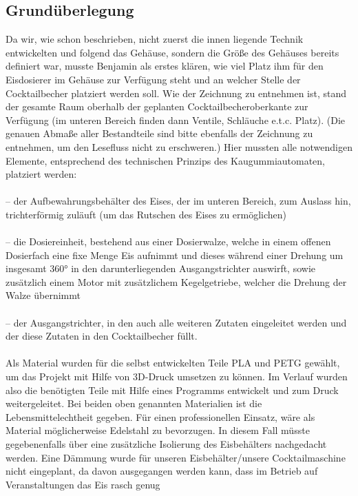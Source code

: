 \documentclass[10pt,a4paper]{report}
\begin{document}
	\subsection{Grundüberlegung}
	Da wir, wie schon beschrieben, nicht zuerst die innen liegende Technik entwickelten und folgend
	das Gehäuse, sondern die Größe des Gehäuses bereits definiert war, musste Benjamin als
	erstes klären, wie viel Platz ihm für den Eisdosierer im Gehäuse zur Verfügung steht und an
	welcher Stelle der Cocktailbecher platziert werden soll. Wie der Zeichnung zu entnehmen ist,
	stand der gesamte Raum oberhalb der geplanten Cocktailbecheroberkante zur Verfügung (im
	unteren Bereich finden dann Ventile, Schläuche e.t.c. Platz). (Die genauen Abmaße aller
	Bestandteile sind bitte ebenfalls der Zeichnung zu entnehmen, um den Lesefluss nicht zu
	erschweren.)
	Hier mussten alle notwendigen Elemente, entsprechend des technischen Prinzips des
	Kaugummiautomaten, platziert werden:\\ \\
	– der Aufbewahrungsbehälter des Eises, der im unteren Bereich, zum Auslass hin,
	trichterförmig zuläuft (um das Rutschen des Eises zu ermöglichen)\\ \\
	– die Dosiereinheit, bestehend aus einer Dosierwalze, welche in einem offenen Dosierfach
	eine fixe Menge Eis aufnimmt und dieses während einer Drehung um insgesamt 360° in
	den darunterliegenden Ausgangstrichter auswirft, sowie zusätzlich einem Motor mit
	zusätzlichem Kegelgetriebe, welcher die Drehung der Walze übernimmt\\ \\
	– der Ausgangstrichter, in den auch alle weiteren Zutaten eingeleitet werden und der diese
	Zutaten in den Cocktailbecher füllt.\\ \\
	\newpage
	Als Material wurden für die selbst entwickelten Teile PLA und PETG gewählt, um das Projekt mit
	Hilfe von 3D-Druck umsetzen zu können. Im Verlauf wurden also die benötigten Teile mit Hilfe
	eines Programms entwickelt und zum Druck weitergeleitet.
	Bei beiden oben genannten Materialien ist die Lebensmittelechtheit gegeben. Für einen
	professionellen Einsatz, wäre als Material möglicherweise Edelstahl zu bevorzugen. In diesem
	Fall müsste gegebenenfalls über eine zusätzliche Isolierung des Eisbehälters nachgedacht
	werden.
	Eine Dämmung wurde für unseren Eisbehälter/unsere Cocktailmaschine nicht eingeplant, da
	davon ausgegangen werden kann, dass im Betrieb auf Veranstaltungen das Eis rasch genug
	
\end{document}
